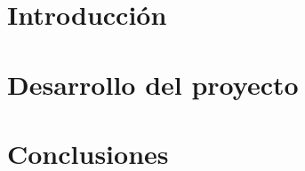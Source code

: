 \documentclass[12pt,a4paper]{book} %
\begin{document}
\frontmatter

%

















\mainmatter

%

\part{Introducción}



\part{Desarrollo del proyecto}



%


%


\part{Conclusiones}



\appendix

%

%

%

\backmatter




\end{document}
